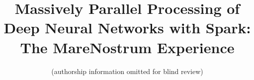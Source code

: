 \documentclass[journal]{IEEEtran}
\begin{document}
\title{Massively Parallel Processing of Deep Neural Networks with Spark: The MareNostrum Experience}

%

%                       

\author{
		(authorship information omitted for blind review)

                       
}


%


\maketitle\thispagestyle{empty}
\end{document}
